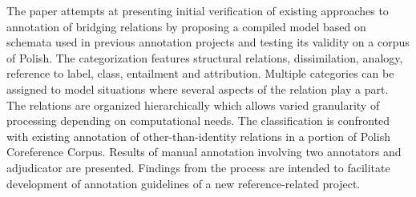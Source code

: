 The paper attempts at presenting initial verification of existing approaches to annotation of bridging relations by proposing a compiled model based on schemata used in previous annotation projects and testing its validity on a corpus of Polish. The categorization features structural relations, dissimilation, analogy, reference to label, class, entailment and attribution. Multiple categories can be assigned to model situations where several aspects of the relation play a part. The relations are organized hierarchically which allows varied granularity of processing depending on computational needs. The classification is confronted with existing annotation of other-than-identity relations in a portion of Polish Coreference Corpus. Results of manual annotation involving two annotators and adjudicator are presented. Findings from the process are intended to facilitate development of annotation guidelines of a new reference-related project.
